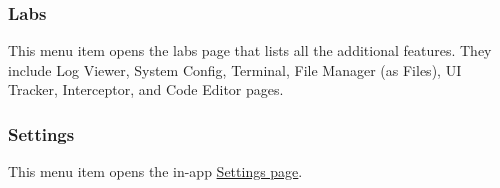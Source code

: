 \subsubsection{Labs} %
This menu item opens the labs page that lists all the additional features. They include Log Viewer,
System Config, Terminal, File Manager (as Files), UI Tracker, Interceptor, and Code Editor pages.

\subsubsection{Settings} %
This menu item opens the in-app \hyperref[sec:settings-page]{Settings page}.
